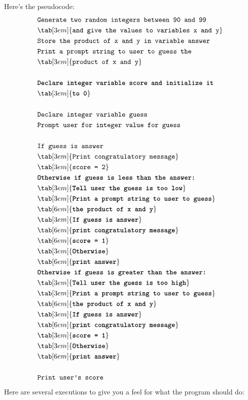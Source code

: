 Here's the pseudocode:
\begin{align*}
&\texttt{Generate two random integers between 90 and 99}\\
&\tab[3em]{\texttt{and give the values to variables x and y}}\\
&\texttt{Store the product of x and y in variable answer}\\
&\texttt{Print a prompt string to user to guess the}\\
&\tab[3em]{\texttt{product of x and y}}\\\\
&\texttt{\textbf{Declare integer variable score and initialize it}}\\
&\tab[3em]{\textbf{\texttt{to 0}}}\\\\
&\texttt{Declare integer variable guess}\\
&\texttt{Prompt user for integer value for guess}\\\\
&\texttt{If guess is answer}\\
&\tab[3em]{\texttt{Print congratulatory message}}\\
&\tab[3em]{\texttt{score = 2}}\\
&\textbf{\texttt{Otherwise if guess is less than the answer:}}\\
&\tab[3em]{\textbf{\texttt{Tell user the guess is too low}}}\\
&\tab[3em]{\textbf{\texttt{Print a prompt string to user to guess}}}\\
&\tab[6em]{\textbf{\texttt{the product of x and y}}}\\
&\tab[3em]{\textbf{\texttt{If guess is answer}}}\\
&\tab[6em]{\textbf{\texttt{print congratulatory message}}}\\
&\tab[6em]{\textbf{\texttt{score = 1}}}\\
&\tab[3em]{\textbf{\texttt{Otherwise}}}\\
&\tab[6em]{\textbf{\texttt{print answer}}}\\
&\textbf{\texttt{Otherwise if guess is greater than the answer:}}\\
&\tab[3em]{\textbf{\texttt{Tell user the guess is too high}}}\\
&\tab[3em]{\textbf{\texttt{Print a prompt string to user to guess}}}\\
&\tab[6em]{\textbf{\texttt{the product of x and y}}}\\
&\tab[3em]{\textbf{\texttt{If guess is answer}}}\\
&\tab[6em]{\textbf{\texttt{print congratulatory message}}}\\
&\tab[3em]{\textbf{\texttt{score = 1}}}\\
&\tab[3em]{\textbf{\texttt{Otherwise}}}\\
&\tab[6em]{\textbf{\texttt{print answer}}}\\\\
&\texttt{Print user's score}\\
\end{align*}
Here are several executions to give you a feel for what the program
should do:

